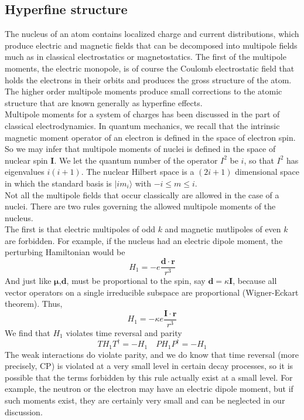 \subsection{Hyperfine structure}
The nucleus of an atom contains localized charge and current distributions, which produce electric and magnetic fields that can be decomposed into multipole fields much as in classical electrostatics or magnetostatics.
The first of the multipole moments, the electric monopole, is of course the Coulomb electrostatic field that holds the electrons in their orbits and produces the gross structure of the atom.
The higher order multipole moments produce small corrections to the atomic structure that are known generally as hyperfine effects.\\
Multipole moments for a system of charges has been discussed in the part of classical electrodynamics. In quantum mechanics, we recall that the intrinsic magnetic moment operator of an electron is defined in the space of electron spin. So we may infer that multipole moments of nuclei is defined in the space of nuclear spin $\bm{I}$. 
We let the quantum number of the operator $I^2$ be $i$, so that $I^2$ has eigenvalues $i(i+1)$. The nuclear Hilbert space is a  $(2i+1)$ dimensional space in which the standard basis is $|im_i\rangle$ with $-i \leq m \leq i$.\\
Not all the multipole fields that occur classically are allowed in the case of a nuclei. There are two rules governing the allowed multipole moments of the nucleus.\\ 
The first is that electric multipoles of odd $k$ and magnetic mutlipoles of even $k$ are forbidden. For example, if the nucleus had an electric dipole moment, the perturbing Hamiltonian would be
\[H_1 = -e \frac{\bm{d}\cdot\bm{r}}{r^3}\]
And just like $\bm{\mu}$,$\bm{d}$, must be proportional to the spin, say $\bm{d} = \kappa\bm{I}$, because all vector operators on a single irreducible subspace are proportional (Wigner-Eckart theorem). Thus,
\[H_1 = -\kappa e \frac{\bm{I}\cdot\bm{r}}{r^3}\]
We find that $H_1$ violates time reversal and parity
\[T H_1 T^{\dagger} = -H_1 \quad P H_1 P^{\dagger} = -H_1\]
The weak interactions do violate parity, and we do know that time reversal (more precisely, CP) is violated at a very small  level in certain decay processes, so it is possible that the terms forbidden by this rule actually exist at a small level. For example, the neutron or the electron may have an electric dipole moment, but if such moments exist, they are certainly very small and can be neglected in our discussion.\\
